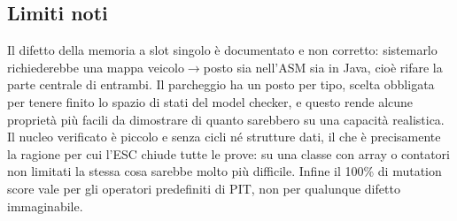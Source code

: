 \subsection*{Limiti noti}

Il difetto della memoria a slot singolo è documentato e non corretto: sistemarlo
richiederebbe una mappa veicolo$\to$posto sia nell'ASM sia in Java, cioè rifare la parte
centrale di entrambi. Il parcheggio ha un posto per tipo, scelta obbligata per tenere
finito lo spazio di stati del model checker, e questo rende alcune proprietà più facili
da dimostrare di quanto sarebbero su una capacità realistica. Il nucleo verificato è
piccolo e senza cicli né strutture dati, il che è precisamente la ragione per cui l'ESC
chiude tutte le prove: su una classe con array o contatori non limitati la stessa cosa
sarebbe molto più difficile. Infine il 100\% di mutation score vale per gli operatori
predefiniti di PIT, non per qualunque difetto immaginabile.
